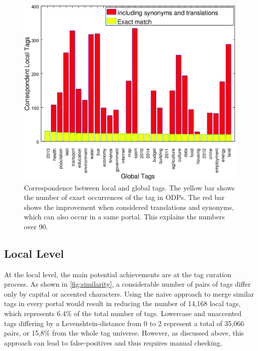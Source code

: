 \begin{figure}[tb]
\begin{center}
\includegraphics[scale=.8]{images/results_tagged_resources.png}
\caption{Correspondence between local and global tags. The yellow bar shows the number of exact occurrences of the tag in ODPs. The red bar shows the improvement when considered translations and synonyms, which can also occur in a same portal. This explains the numbers over 90. }
\label{fig:results_tagged_resources}
\end{center}
\end{figure}

\subsection{Local Level}

At the local level, the main potential achievements are at the tag curation process.
As shown in \autoref{fig:similarity}, a considerable number of pairs of tags differ only by capital or accented characters.
Using the naive approach to merge similar tags in every portal would result in reducing the number of 14,168 local tags, which represents 6.4\% of the total number of tags.
Lowercase and unaccented tags differing by a Levenshtein-distance from 0 to 2 represent a total of 35,066 pairs, or 15,8\% from the whole tag universe.
However, as discussed above, this approach can lead to false-positives and thus requires manual checking.


